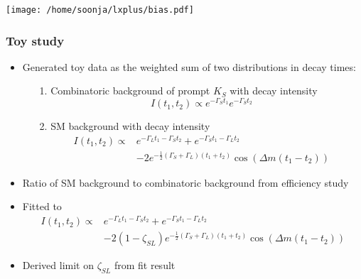 \documentclass{beamer}
\begin{document}
\begin{frame}
\begin{center}
\texttt{[image: /home/soonja/lxplus/bias.pdf]}
\end{center}
\end{frame}



\begin{frame}
\frametitle{Toy study}
\begin{itemize}
\item Generated toy data as the weighted sum of two distributions in decay times:
\begin{itemize}
\item[1.] Combinatoric background of prompt $K_S$ with decay intensity
\begin{equation*}
I(t_1,t_2) \propto e^{-\Gamma_S t_1}e^{-\Gamma_S t_2}  
\end{equation*}
\item[2.] SM background with decay intensity
\begin{align*}
I(t_1,t_2) \propto & e^{-\Gamma_L t_1 - \Gamma_S t_2} +e^{-\Gamma_S t_1 - \Gamma_L t_2}\\& - 2 e^{-\frac{1}{2}\left(\Gamma_S + \Gamma_L\right)\left(t_1+t_2\right)}\cos\left(\Delta m \left(t_1-t_2\right)\right)
\end{align*}
\end{itemize}
\item Ratio of SM background to combinatoric background from efficiency study
\item Fitted to 
\begin{align*}
I(t_1,t_2) \propto & e^{-\Gamma_L t_1 - \Gamma_S t_2} +e^{-\Gamma_S t_1 - \Gamma_L t_2}\\& - 2(1-\zeta_{SL}) e^{-\frac{1}{2}\left(\Gamma_S + \Gamma_L\right)\left(t_1+t_2\right)}\cos\left(\Delta m \left(t_1-t_2\right)\right)
\end{align*}
\item Derived limit on $\zeta_{SL}$ from fit result 
\end{itemize}
\end{frame}
\end{document}
